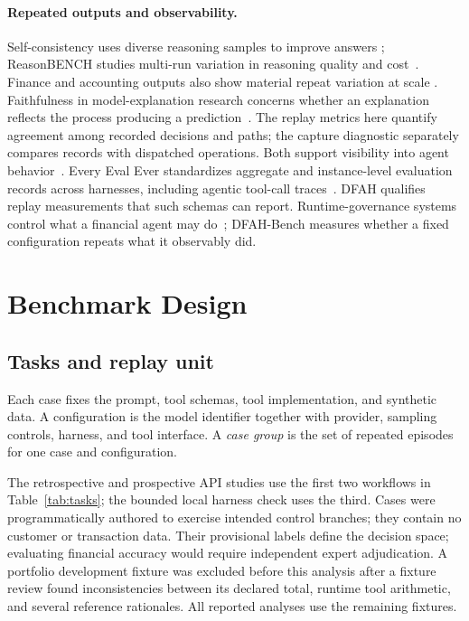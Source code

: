 \documentclass{article}
\begin{document}
\paragraph{Repeated outputs and observability.}
Self-consistency uses diverse reasoning samples to improve answers
\citep{wang2023selfconsistency}; ReasonBENCH studies multi-run variation in
reasoning quality and cost~\citep{potamitis2025reasonbench}.  Finance and
accounting outputs also show material repeat variation at scale
\citep{wang2025consistency}. Faithfulness in model-explanation research concerns whether an
explanation reflects the process producing a prediction~\citep{jacovi2020faithfulness}.
The replay metrics here quantify agreement among recorded decisions and paths;
the capture diagnostic separately compares records with dispatched operations.
Both support visibility into agent behavior~\citep{chan2024visibility}.
Every Eval Ever standardizes aggregate and instance-level evaluation records
across harnesses, including agentic tool-call traces~\citep{batzner2026every}.
DFAH qualifies replay measurements that such schemas can report.
Runtime-governance systems control what a financial agent may
do~\citep{szpruch2026runtime}; DFAH-Bench measures whether a fixed
configuration repeats what it observably did.

\section{Benchmark Design}

\subsection{Tasks and replay unit}

Each case fixes the prompt, tool schemas, tool implementation, and synthetic
data.  A configuration is the model identifier together with provider,
sampling controls, harness, and tool interface.  A \emph{case group} is the
set of repeated episodes for one case and configuration.

The retrospective and prospective API studies use the first two workflows in
Table~\ref{tab:tasks}; the bounded local harness check uses the third.  Cases
were programmatically authored to exercise intended control branches; they
contain no customer or transaction data.  Their provisional labels define the
decision space; evaluating financial accuracy would require independent expert
adjudication.  A portfolio development
fixture was excluded before this analysis after a
fixture review found inconsistencies between its declared total, runtime tool
arithmetic, and several reference rationales.  All reported analyses use the
remaining fixtures.
\end{document}
